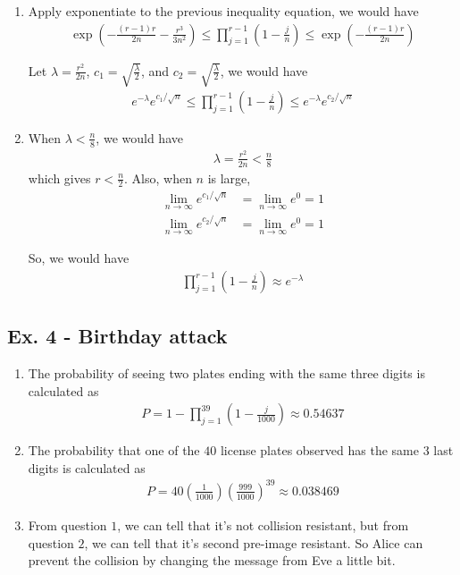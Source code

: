 \documentclass[11pt,a4paper]{article}
\begin{document}
\begin{enumerate}
\item Apply exponentiate to the previous inequality equation, we would have
	\begin{align*}
	\exp\left(-\frac{(r-1)r}{2n}-\frac{r^3}{3n^2}\right) \leq \prod_{j=1}^{r-1}\left(1-\frac{j}{n}\right) \leq \exp\left(-\frac{(r-1)r}{2n}\right)
	\end{align*}
\par Let $\lambda = \frac{r^2}{2n}$, $c_{1} = \sqrt{\frac{\lambda}{2}}$, and $c_{2} = \sqrt{\frac{\lambda}{2}}$, we would have
	\begin{align*}
	e^{-\lambda}e^{c_{1}/\sqrt{n}} \leq \prod_{j=1}^{r-1} \left(1-\frac{j}{n}\right) \leq e^{-\lambda}e^{c_{2}/\sqrt{n}}
	\end{align*}

\item When $\lambda < \frac{n}{8}$, we would have
	\begin{align*}
	\lambda = \frac{r^2}{2n} < \frac{n}{8}
	\end{align*}
which gives $r < \frac{n}{2}$. Also, when $n$ is large,
	\begin{align*}
	\lim_{n\to\infty}e^{c_1/\sqrt{n}} &= \lim_{n\to\infty}e^0 = 1 \\
	\lim_{n\to\infty}e^{c_2/\sqrt{n}} &= \lim_{n\to\infty}e^0=1
	\end{align*}
\par So, we would have
	\begin{align*}
	\prod_{j=1}^{r-1}\left(1-\frac{j}{n}\right) \approx e^{-\lambda}
	\end{align*}
\end{enumerate}



\subsection*{Ex. 4 - Birthday attack}
\begin{enumerate}
\item The probability of seeing two plates ending with the same three digits is calculated as
	\begin{align*}
	P = 1 - \prod_{j=1}^{39}\left(1 - \frac{j}{1000}\right) \approx 0.54637
	\end{align*}

\item The probability that one of the $40$ license plates observed has the same $3$ last digits is calculated as
	\begin{align*}
	P = 40\left(\frac{1}{1000}\right)\left(\frac{999}{1000}\right)^{39} \approx 0.038469
	\end{align*}

\item From question $1$, we can tell that it's not collision resistant, but from question $2$, we can tell that it's second pre-image resistant. So Alice can prevent the collision by changing the message from Eve a little bit.
\end{enumerate}
\end{document}
